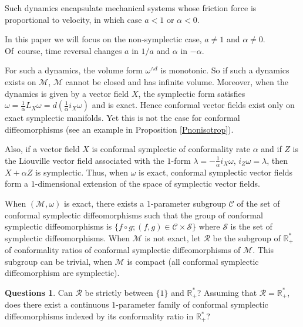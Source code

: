 \documentclass[JEP,XML,SOM,Unicode,published]{cedram}
\theoremstyle{definition}
\newtheorem*{questions*}{Questions}
\def\R{\mathbb{R}}
\def\cC{{\mathcal C}}
\def\cM{{\mathcal M}}
\def\cR{{\mathcal R}}
\def\cS{{\mathcal S}}
\begin{document}
Such dynamics encapsulate mechanical systems whose friction force is proportional to velocity, in which case $a<1$ or $\alpha<0$.

In this paper we will focus on the non-symplectic case, \ie $a \neq 1$ and $\alpha \neq 0$. Of~course, time reversal changes $a$ in $1/a$ and $\alpha$ in $-\alpha$.

For such a dynamics, the volume form $\omega^{\wedge d}$ is monotonic. So if such a dynamics exists on $\cM$, $\cM$ cannot be closed and has infinite volume. Moreover, when the dynamics is given by a vector field $X$, the symplectic form satisfies $\omega=\frac{1}{\alpha} L_X\omega= d\left(\frac{1}{\alpha}i_X\omega\right)$ and is exact. Hence conformal vector fields exist only on exact symplectic manifolds. Yet this is not the case for conformal diffeomorphisms (see an example in Proposition \ref{Pnonisotrop}).

Also, if a vector field $X$ is conformal symplectic of conformality rate $\alpha$ and if $Z$ is the Liouville vector field associated with the $1$-form $\lambda= - \frac{1}{\alpha}i_X\omega$, \ie $i_Z\omega = \lambda$, then $X+\alpha Z$ is symplectic. Thus, when $\omega$ is exact, conformal symplectic vector fields form a $1$-dimensional extension of the space of symplectic vector fields.

When $(\cM, \omega)$ is exact, there exists a 1-parameter subgroup $\cC$ of the set of conformal symplectic diffeomorphisms such that the group of conformal symplectic diffeomorphisms is $\{f\circ g; (f, g)\in \cC\times\cS\}$ where $\cS$ is the set of symplectic diffeomorphisms. When $\cM$ is not exact, let $\cR$ be the subgroup of $\R_+^*$ of conformality ratios of conformal symplectic diffeomorphisms of $\cM$. This subgroup can be trivial, \eg when $\cM$ is compact (all conformal symplectic diffeomorphism are symplectic).

\begin{questions*}
Can $\cR$ be strictly between $\{1\}$ and $\R^*_+$? Assuming that $\cR=\R^*_+$, does there exist a continuous $1$-para\-meter family of conformal symplectic diffeomorphisms indexed by its conformality ratio in $\R^*_+$?
\end{questions*}
\end{document}
